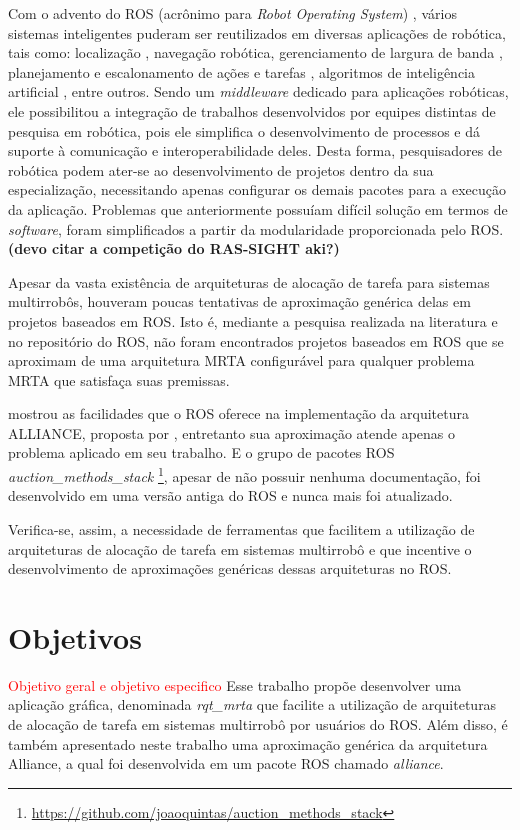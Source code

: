         Com o advento do ROS (acrônimo para \textit{Robot Operating System}) \cite{ref:quigley2009ros}, vários sistemas inteligentes puderam ser reutilizados em diversas aplicações de robótica, tais como: localização \cite{ref:li2017kld-samcl}, navegação robótica, gerenciamento de largura de banda \cite{ref:julio2015dynamic}, planejamento e escalonamento de ações e tarefas \cite{ref:fox2003pddl2, ref:manne1960job}, algoritmos de inteligência artificial \cite{ref:adrianohrl2015fuzzy, ref:watkins1992qlearning}, entre outros. Sendo um \textit{middleware} dedicado para aplicações robóticas, ele possibilitou a integração de trabalhos desenvolvidos por equipes distintas de pesquisa em robótica, pois ele simplifica o desenvolvimento de processos e dá suporte à comunicação e interoperabilidade deles. Desta forma, pesquisadores de robótica podem ater-se ao desenvolvimento de projetos dentro da sua especialização, necessitando apenas configurar os demais pacotes para a execução da aplicação. Problemas que anteriormente possuíam difícil solução em termos de \textit{software}, foram simplificados a partir da modularidade proporcionada pelo ROS. \textbf{\color{green}(devo citar a competição do RAS-SIGHT aki?)}
        
        Apesar da vasta existência de arquiteturas de alocação de tarefa para sistemas multirrobôs, houveram poucas tentativas de aproximação genérica delas em projetos baseados em ROS. Isto é, mediante a pesquisa realizada na literatura e no repositório do ROS, não foram encontrados projetos baseados em ROS que se aproximam de uma arquitetura MRTA configurável para qualquer problema MRTA que satisfaça suas premissas.
        
         mostrou as facilidades que o ROS oferece na implementação da arquitetura ALLIANCE, proposta por , entretanto sua aproximação atende apenas o problema aplicado em seu trabalho. E o grupo de pacotes ROS \textit{auction\_methods\_stack
}\footnote{\url{https://github.com/joaoquintas/auction_methods_stack}}, apesar de não possuir nenhuma documentação, foi desenvolvido em uma versão antiga do ROS e nunca mais foi atualizado.
        
        Verifica-se, assim, a necessidade de ferramentas que facilitem a utilização de arquiteturas de alocação de tarefa em sistemas multirrobô e que incentive o desenvolvimento de aproximações genéricas dessas arquiteturas no ROS.
    
    \section{Objetivos}
        \textcolor{red}{Objetivo geral e objetivo especifico}
        Esse trabalho propõe desenvolver uma aplicação gráfica, denominada \textit{rqt\_mrta} que facilite a utilização de arquiteturas de alocação de tarefa em sistemas multirrobô por usuários do ROS. Além disso, é também apresentado neste trabalho uma aproximação genérica da arquitetura Alliance, a qual foi desenvolvida em um pacote ROS chamado \textit{alliance}.
        
